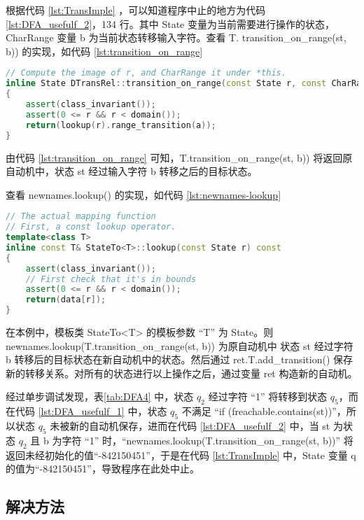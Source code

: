 根据代码 \ref{lst:TransImple} ，可以知道程序中止的地方为代码 \ref{lst:DFA_usefulf_2}，134 行。其中 State 变量为当前需要进行操作的状态，CharRange 变量 b 为当前状态转移输入字符。查看 T.
transition\_on\_range(st, b)) 的实现，如代码 \ref{lst:transition_on_range}
\lstset{style=mystyle}
\begin{lstlisting}[language=C++,label={lst:transition_on_range},caption={ DTransRel.cpp },firstnumber=108]
// Compute the image of r, and CharRange it under *this.
inline State DTransRel::transition_on_range(const State r, const CharRange a) const
{
    assert(class_invariant());
    assert(0 <= r && r < domain());
    return(lookup(r).range_transition(a));
}
\end{lstlisting}
由代码 \ref{lst:transition_on_range} 可知，T.transition\_on\_range(st, b)) 将返回原自动机中，状态 st 经过输入字符 b 转移之后的目标状态。

查看 newnames.lookup() 的实现，如代码 \ref{lst:newnames-lookup}
\lstset{style=mystyle}
\begin{lstlisting}[language=C++,label={lst:newnames-lookup},caption={ StateTo.h },firstnumber=177]
// The actual mapping function
// First, a const lookup operator.
template<class T>
inline const T& StateTo<T>::lookup(const State r) const
{
    assert(class_invariant());
    // First check that it's in bounds
    assert(0 <= r && r < domain());
    return(data[r]);
}
\end{lstlisting}
在本例中，模板类 StateTo<T> 的模板参数 “T” 为 State。则 newnames.lookup(T.transition\_on\_range(st, b)) 为原自动机中 状态 st 经过字符 b 转移后的目标状态在新自动机中的状态。然后通过 ret.T.add\_transition() 保存新的转移关系。对所有的状态进行以上操作之后，通过变量 ret 构造新的自动机。 

经过单步调试发现，表\ref{tab:DFA4} 中，状态 $q_2$ 经过字符 “1” 将转移到状态 $q_5$，而在代码 \ref{lst:DFA_usefulf_1} 中，状态 $q_5$ 不满足 “if (freachable.contains(st))”，所以状态 $q_5$ 未被新的自动机保存，进而在代码 \ref{lst:DFA_usefulf_2} 中，当 st 为状态 $q_2$ 且 b 为字符 “1” 时，“newnames.lookup(T.transition\_on\_range(st, b))” 将返回未经初始化的值“-842150451”，于是在代码 \ref{lst:TransImple} 中，State 变量 q 的值为“-842150451”，导致程序在此处中止。

\subsection{解决方法}

